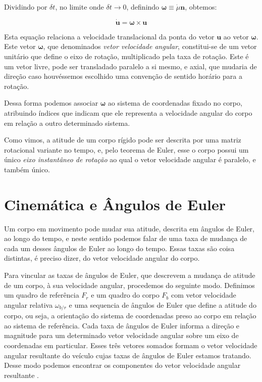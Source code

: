 Dividindo por \(\delta t\), no limite onde \(\delta t \rightarrow 0\), definindo \(\mathbf{\omega} \equiv \dot{\mu}\mathbf{n}\), obtemos:

\begin{equation*}
    \dot{\mathbf{u}} = \mathbf{\omega}\!\times\!\mathbf{u}\tag{1.4-1}
\end{equation*}

Esta equação relaciona a velocidade translacional da ponta do vetor \(\mathbf{u}\) ao vetor \(\mathbf{\omega}\). Este vetor \(\mathbf{\omega}\), que denominados \textit{vetor velocidade angular}, constitui-se de um vetor unitário  que define o eixo de rotação, multiplicado pela taxa de rotação. Este é um vetor livre, pode ser transladado paralelo a si mesmo, e axial, que mudaria de direção caso houvéssemos escolhido uma convenção de sentido horário para a rotação.

Dessa forma podemos associar \(\mathbf{\omega}\) ao sistema de coordenadas fixado no corpo, atribuindo índices que indicam que ele representa a velocidade angular do corpo em relação a outro determinado sistema.

Como vimos, a atitude de um corpo rígido pode ser descrita por uma matriz rotacional variante no tempo, e, pelo teorema de Euler\footnotemark{}, esse o corpo possui um único \emph{eixo instantâneo de rotação} ao qual o vetor velocidade angular é paralelo, e também único.


\section{Cinemática e Ângulos de Euler}

Um corpo em movimento pode mudar sua atitude, descrita em ângulos de Euler, ao longo do tempo, e neste sentido podemos falar de uma taxa de mudança de cada um desses ângulos de Euler ao longo do tempo. Essas taxas são coisa distintas, é preciso dizer, do vetor velocidade angular do corpo.

Para vincular as taxas de ângulos de Euler, que descrevem a mudança de atitude de um corpo, à sua velocidade angular, procedemos do seguinte modo. Definimos um quadro de referência \(F_{r}\) e um quadro do corpo \(F_{b}\) com vetor velocidade angular relativa \(\omega_{b/r}\) e uma sequencia de ângulos de Euler que define a atitude do corpo, ou seja, a orientação do sistema de coordenadas preso ao corpo em relação ao sistema de referência. Cada taxa de ângulos de Euler informa a direção e magnitude para um determinado vetor velocidade angular sobre um eixo de coordenadas em particular. Esses três vetores somados formam o vetor velocidade angular resultante do veículo cujas taxas de ângulos de Euler estamos tratando. Desse modo podemos encontrar os componentes do vetor velocidade angular resultante \cite{Stevens2016}.


